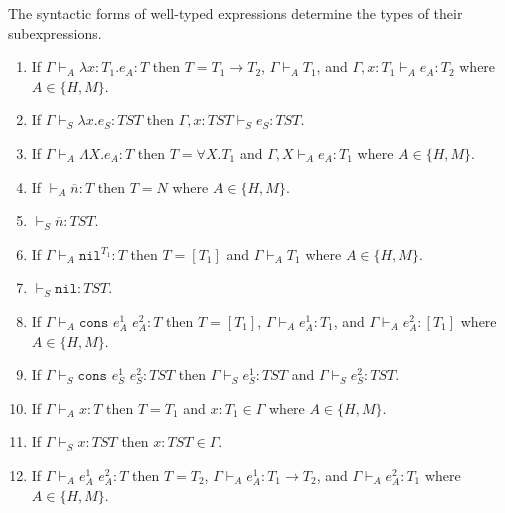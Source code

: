 \begin{lemma}

\label{i}

The syntactic forms of well-typed expressions determine the types of their subexpressions.

\begin{enumerate}

\item If $\Gamma\vdash_{A}\lambda x:T_{1}.e_{A}:T$ then $T=T_{1}\rightarrow T_{2}$, $\Gamma\vdash_{A}T_{1}$, and $\Gamma,x:T_{1}\vdash_{A}e_{A}:T_{2}$ where $A\in\lbrace H,M\rbrace$.

\item If $\Gamma\vdash_{S}\lambda x.e_{S}:TST$ then $\Gamma,x:TST\vdash_{S}e_{S}:TST$.

\item If $\Gamma\vdash_{A}\Lambda X.e_{A}:T$ then $T=\forall X.T_{1}$ and $\Gamma,X\vdash_{A}e_{A}:T_{1}$ where $A\in\lbrace H,M\rbrace$.

\item If $\vdash_{A}\overline{n}:T$ then $T=N$ where $A\in\lbrace H,M\rbrace$.

\item $\vdash_{S}\overline{n}:TST$.

\item If $\Gamma\vdash_{A}\mathtt{nil}^{T_{1}}:T$ then $T=[T_{1}]$ and $\Gamma\vdash_{A}T_{1}$ where $A\in\lbrace H,M\rbrace$.

\item $\vdash_{S}\mathtt{nil}:TST$.

\item If $\Gamma\vdash_{A}\mathtt{cons}$ $e_{A}^{1}$ $e_{A}^{2}:T$ then $T=[T_{1}]$, $\Gamma\vdash_{A}e_{A}^{1}:T_{1}$, and $\Gamma\vdash_{A}e_{A}^{2}:[T_{1}]$ where $A\in\lbrace H,M\rbrace$.

\item If $\Gamma\vdash_{S}\mathtt{cons}$ $e_{S}^{1}$ $e_{S}^{2}:TST$ then $\Gamma\vdash_{S}e_{S}^{1}:TST$ and $\Gamma\vdash_{S}e_{S}^{2}:TST$.

\item If $\Gamma\vdash_{A}x:T$ then $T=T_{1}$ and $x:T_{1}\in\Gamma$ where $A\in\lbrace H,M\rbrace$.

\item If $\Gamma\vdash_{S}x:TST$ then $x:TST\in\Gamma$.

\item If $\Gamma\vdash_{A}e_{A}^{1}$ $e_{A}^{2}:T$ then $T=T_{2}$, $\Gamma\vdash_{A}e_{A}^{1}:T_{1}\rightarrow T_{2}$, and $\Gamma\vdash_{A}e_{A}^{2}:T_{1}$ where $A\in\lbrace H,M\rbrace$.


\end{enumerate}
\end{lemma}
